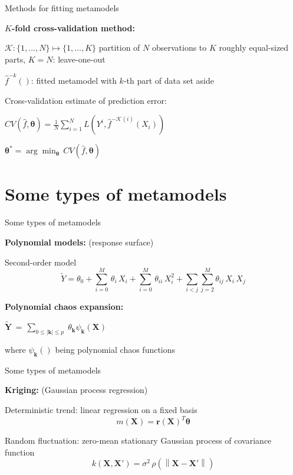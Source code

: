 \documentclass{beamer}
\begin{document}

\begin{frame}[t]{Methods for fitting metamodels}

{\bf $K$-fold cross-validation method:}

$\mathcal{K}: \{1, \dots , N\} \mapsto \{1, \dots, K\}$ partition of $N$ observations to $K$ roughly equal-sized parts, $K=N$: leave-one-out

$\hat{f}^{-k}()$: fitted metamodel with $k$-th part of data set aside

Cross-validation estimate of prediction error:
\begin{center}
$CV(\hat{f}, \boldsymbol{\theta}) = \frac{1}{N} \sum_{i=1}^N L ( Y^i, \hat{f}^{-\mathcal{K}(i)}(X_i) )$
\end{center}

\begin{center}
$
\boldsymbol{\theta}^* = \arg \min_{\boldsymbol{\theta}} \, CV(\hat{f}, \boldsymbol{\theta})
$
\end{center}

\end{frame}


\section{Some types of metamodels}
\begin{frame}[t]{Some types of metamodels}

{\bf Polynomial models:} (response surface)

Second-order model
\[
\tilde{Y} = \theta_0 + \sum_{i=0}^M \, \theta_i \, X_i + \sum_{i=0}^M \, \theta_{ii} \,X_i^2 + \sum_{i<j} \sum_{j=2}^M \theta_{ij} \,X_i \, X_j
\]

{\bf Polynomial chaos expansion:} 
\begin{center}
$\displaystyle{ \tilde{\boldsymbol{Y}} }\,  = \, 
\sum_{0 \leq |\boldsymbol{k}| \leq p}  \; \theta_{\boldsymbol{k}} \psi_{\boldsymbol{k}}(\boldsymbol{X})  \, $
\end{center}
where $\psi_{\boldsymbol{k}}()$ being polynomial chaos functions

\end{frame}


\begin{frame}[t]{Some types of metamodels}

{\bf Kriging:} (Gaussian process regression)

Deterministic trend: linear regression on a fixed basis
\[
m(\boldsymbol{X}) = \boldsymbol{r(\boldsymbol{X})}^T \boldsymbol{\theta} 
\]

Random fluctuation: zero-mean stationary Gaussian process of covariance function 
\[
k(\boldsymbol{X}, \boldsymbol{X'}) = \sigma^2 \, \rho( \left\lVert \boldsymbol{X} - \boldsymbol{X'}  \right\rVert)
\]

\end{frame}
\end{document}
